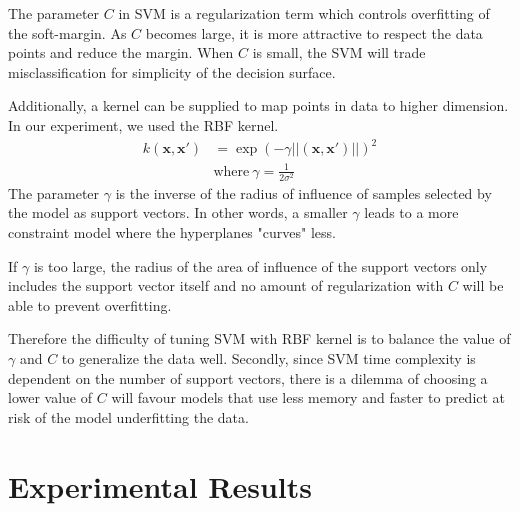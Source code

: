 \documentclass[letterpaper]{article}
\begin{document}
The parameter $\textit{C}$ in SVM is a regularization term which controls overfitting of the soft-margin.
As $\textit{C}$ becomes large, it is more attractive to respect the data points and reduce
the margin. When $\textit{C}$ is small, the SVM will trade misclassification for simplicity
of the decision surface.

Additionally, a kernel can be supplied to map points in data to higher dimension. In our
experiment, we used the RBF kernel.
\begin{align*}
k (\textbf{x},\textbf{x}') &= \exp(-\gamma||(\textbf{x},\textbf{x}')||)^2 \\
&\text{where} \ \gamma = \frac{1}{2\sigma^2}
\end{align*}
The parameter $\gamma$ is the inverse of the radius of influence of samples selected by the
model as support vectors. In other words, a smaller $\gamma$ leads to a more constraint
model where the hyperplanes "curves" less.

If $\gamma$ is too large, the radius of the area of influence of the support vectors only
includes the support vector itself and no amount of regularization with $\textit{C}$ will be
able to prevent overfitting.

Therefore the difficulty of tuning SVM with RBF kernel is to balance the value of
$\gamma$ and $\textit{C}$ to generalize the data well. Secondly, since SVM time complexity
is dependent on the number of support vectors, there is a dilemma of choosing a lower value
of $\textit{C}$ will favour models that use less memory and faster to predict at risk of
the model underfitting the data.

\section{Experimental Results}
\end{document}
